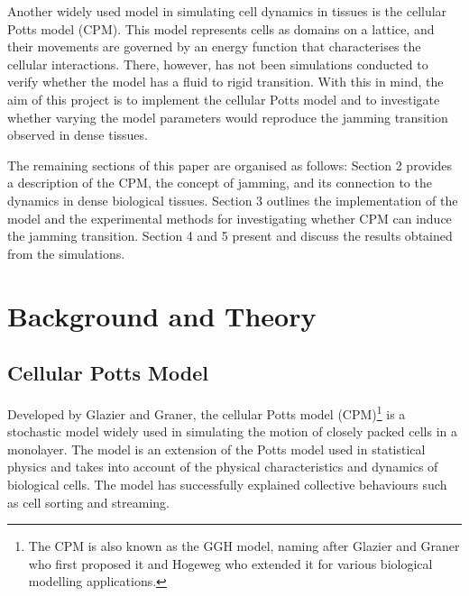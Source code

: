 \documentclass[a4paper,12pt]{article}
\begin{document}
Another widely used model in simulating cell dynamics in tissues is the cellular Potts model (CPM). This model represents cells as domains on a lattice, and their movements are governed by an energy function that characterises the cellular interactions. There, however, has not been simulations conducted to verify whether the model has a fluid to rigid transition. With this in mind, the aim of this project is to implement the cellular Potts model and to investigate whether varying the model parameters would reproduce the jamming transition observed in dense tissues. 

The remaining sections of this paper are organised as follows: Section 2 provides a description of the CPM, the concept of jamming, and its connection to the dynamics in dense biological tissues. Section 3 outlines the implementation of the model and the experimental methods for investigating whether CPM can induce the jamming transition. Section 4 and 5 present and discuss the results obtained from the simulations. 


%


\section{Background and Theory}
\subsection{Cellular Potts Model}
Developed by Glazier and Graner\cite{graner1992}, the cellular Potts model (CPM)\footnote{The CPM is also known as the GGH model, naming after Glazier and Graner who first proposed it and Hogeweg who extended it for various biological modelling applications.} is a stochastic model widely used in simulating the motion of closely packed cells in a monolayer. The model is an extension of the Potts model used in statistical physics and takes into account of the physical characteristics and dynamics of biological cells. The model has successfully explained collective behaviours such as cell sorting \cite{graner1992} and streaming\cite{szabo2010}.
\end{document}

